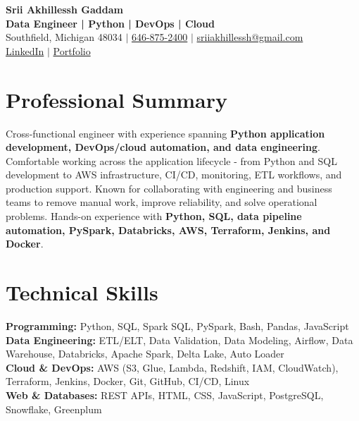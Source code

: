 \documentclass[letterpaper,10pt]{article}
\begin{document}
\fontsize{9.35pt}{10.45pt}\selectfont

\begin{center}
    {\LARGE \textbf{Srii Akhillessh Gaddam}} \\[-1pt]
    \textbf{Data Engineer | Python | DevOps | Cloud} \\[2pt]
    Southfield, Michigan 48034 $|$
    \href{tel:6468752400}{646-875-2400} $|$
    \href{mailto:sriiakhillessh@gmail.com}{sriiakhillessh@gmail.com} \\[1pt]
    \href{https://www.linkedin.com/in/srii-akhiilessh-gaddam-b48668191/}{LinkedIn} $|$
    \href{https://sriiakhillesshg.github.io/portfolio/}{Portfolio}
\end{center}
\vspace{-8pt}

\section{Professional Summary}
\small{Cross-functional engineer with experience spanning \textbf{Python application development, DevOps/cloud automation, and data engineering}. Comfortable working across the application lifecycle - from Python and SQL development to AWS infrastructure, CI/CD, monitoring, ETL workflows, and production support. Known for collaborating with engineering and business teams to remove manual work, improve reliability, and solve operational problems. Hands-on experience with \textbf{Python, SQL, data pipeline automation, PySpark, Databricks, AWS, Terraform, Jenkins, and Docker}.}

\section{Technical Skills}
\small{
\textbf{Programming:} Python, SQL, Spark SQL, PySpark, Bash, Pandas, JavaScript \\
\textbf{Data Engineering:} ETL/ELT, Data Validation, Data Modeling, Airflow, Data Warehouse, Databricks, Apache Spark, Delta Lake, Auto Loader \\
\textbf{Cloud \& DevOps:} AWS (S3, Glue, Lambda, Redshift, IAM, CloudWatch), Terraform, Jenkins, Docker, Git, GitHub, CI/CD, Linux \\
\textbf{Web \& Databases:} REST APIs, HTML, CSS, JavaScript, PostgreSQL, Snowflake, Greenplum
}
\end{document}
